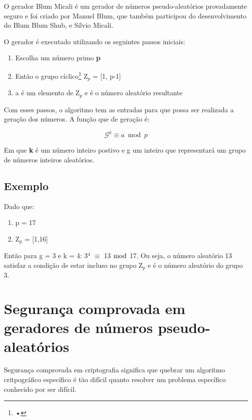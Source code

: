 O gerador Blum Micali é um gerador de números pseudo-aleatórios provadamente seguro e foi criado por Manuel Blum, que também participou do desenvolvimento do Blum Blum Shub, e Silvio Micali. ~\cite{josefin-martin}

O gerador é executado utilizando os seguintes passos iniciais:

\begin{enumerate}
	\item Escolha um número primo \textbf{p}
	\item Então o grupo cíclico\footnote{•} Z$_p$ = [1, p-1]
	\item a é um elemento de Z$_p$ e é o número aleatório resultante
\end{enumerate}


Com esses passos, o algoritmo tem as entradas para que possa ser realizada a geração dos números. A função que de geração é:

\begin{equation}
	\mathcal{G}^k \equiv a \bmod p
\end{equation}

Em que \textbf{k} é um número inteiro postivo e g um inteiro que representará um grupo de números inteiros aleatórios.

\subsection{Exemplo}

Dado que:

\begin{enumerate}
	\item p = 17
	\item Z$_p$ = [1,16]
\end{enumerate}

Então para g = 3 e k = 4: 3$^4$ $\equiv$ 13 $\bmod$ 17. Ou seja, o número aleatório 13 satisfaz a condição de estar incluso no grupo Z$_p$ e é o número aleatório do grupo 3.

\section{Segurança comprovada em geradores de números pseudo-aleatórios}
\label{security-of-prng}

Segurança comprovada em criptografia significa que quebrar um algoritmo critpográfico específico é tão difícil quanto resolver um problema específico conhecido por ser difícil. ~\cite{josefin-martin}

